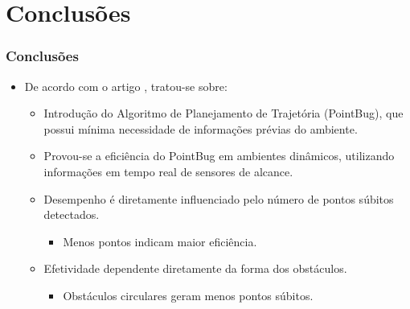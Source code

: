 \documentclass[xcolor=dvipsnames, aspectratio=169]{beamer}
\begin{document}
\section{Conclusões}
\begin{frame}[fragile]
  \frametitle{Conclusões}
  \begin{itemize}
    \item De acordo com o artigo \cite{buniyamin2011simple}, tratou-se sobre:
    \begin{itemize}
      \item Introdução do Algoritmo de Planejamento de Trajetória (PointBug), que possui mínima necessidade de informações prévias do ambiente.
      \item Provou-se a eficiência do PointBug em ambientes dinâmicos, utilizando informações em tempo real de sensores de alcance.
      \item Desempenho é diretamente influenciado pelo número de pontos súbitos detectados.
      \begin{itemize}
        \item Menos pontos indicam maior eficiência.
      \end{itemize}
      \item Efetividade dependente diretamente da forma dos obstáculos.
      \begin{itemize}
        \item Obstáculos circulares geram menos pontos súbitos.
      \end{itemize} 
    \end{itemize}

  \end{itemize}
\end{frame}

\begin{frame}
    \printbibliography
\end{frame}


\begin{frame}
\titlepage %
\end{frame}
\end{document}
